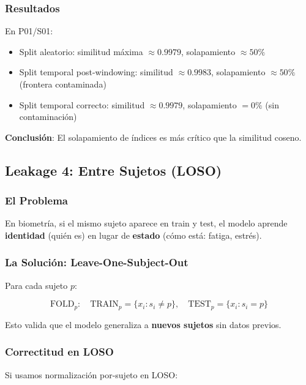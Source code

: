 \documentclass[11pt,twoside,a4paper]{article}
\begin{document}
\subsubsection{Resultados}

En P01/S01:
\begin{itemize}
    \item Split aleatorio: similitud máxima $\approx 0.9979$, solapamiento $\approx 50\%$
    \item Split temporal post-windowing: similitud $\approx 0.9983$, solapamiento $\approx 50\%$ (frontera contaminada)
    \item Split temporal correcto: similitud $\approx 0.9979$, solapamiento $= 0\%$ (sin contaminación)
\end{itemize}

\textbf{Conclusión}: El solapamiento de índices es más crítico que la similitud coseno.

\subsection{Leakage 4: Entre Sujetos (LOSO)}

\subsubsection{El Problema}

En biometría, si el mismo sujeto aparece en train y test, el modelo aprende \textbf{identidad} (quién es) en lugar de \textbf{estado} (cómo está: fatiga, estrés).

\subsubsection{La Solución: Leave-One-Subject-Out}

Para cada sujeto $p$:

\begin{equation}
\text{FOLD}_p: \quad \text{TRAIN}_p = \{x_i : s_i \neq p\}, \quad \text{TEST}_p = \{x_i : s_i = p\}
\end{equation}

Esto valida que el modelo generaliza a \textbf{nuevos sujetos} sin datos previos.

\subsubsection{Correctitud en LOSO}

Si usamos normalización por-sujeto en LOSO:
\end{document}
